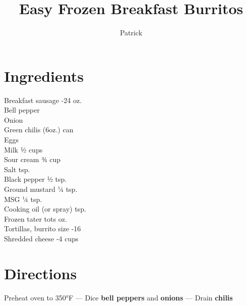 \documentclass[11pt,letterpaper]{article}
\title{Easy Frozen Breakfast Burritos}
\author{Patrick }
\date{}
\begin{document}
\maketitle
\thispagestyle{empty}

\section*{Ingredients}
\setlength{\columnsep}{20pt}
\begin{multicols}{2}
\noindent
    Breakfast sausage -24 oz. \\
    Bell pepper  \\
    Onion  \\
    Green chilis  (6oz.) can \\
    Eggs  \\
    Milk  ½ cups \\
    \columnbreak
    Sour cream \dotfill ¾ cup \\
    Salt  tsp. \\
    Black pepper \dotfill ½ tsp. \\
    Ground mustard \dotfill ¼ tsp. \\
    MSG \dotfill ¼ tsp. \\
    Cooking oil (or spray)  tsp. \\
    Frozen tater tots  oz. \\
    Tortillas, burrito size -16 \\
    Shredded cheese -4 cups
\end{multicols}

\section*{Directions}
\noindent
Preheat oven to 350°F --- Dice \textbf{bell peppers} and \textbf{onions} --- Drain \textbf{chilis}
\end{document}
